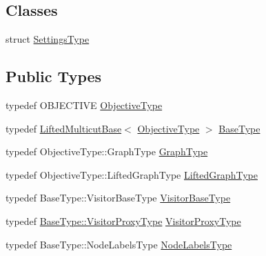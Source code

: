\subsection*{Classes}
\begin{DoxyCompactItemize}
\item 
struct \hyperlink{structnifty_1_1graph_1_1opt_1_1lifted__multicut_1_1LiftedMulticutKernighanLin_1_1SettingsType}{Settings\+Type}
\end{DoxyCompactItemize}
\subsection*{Public Types}
\begin{DoxyCompactItemize}
\item 
typedef O\+B\+J\+E\+C\+T\+I\+VE \hyperlink{classnifty_1_1graph_1_1opt_1_1lifted__multicut_1_1LiftedMulticutKernighanLin_ace1226557a9d65b35b09e1e38b11b0b3}{Objective\+Type}
\item 
typedef \hyperlink{classnifty_1_1graph_1_1opt_1_1lifted__multicut_1_1LiftedMulticutBase}{Lifted\+Multicut\+Base}$<$ \hyperlink{classnifty_1_1graph_1_1opt_1_1lifted__multicut_1_1LiftedMulticutKernighanLin_ace1226557a9d65b35b09e1e38b11b0b3}{Objective\+Type} $>$ \hyperlink{classnifty_1_1graph_1_1opt_1_1lifted__multicut_1_1LiftedMulticutKernighanLin_a6f0d8b3e69c0ee70c3241eda595ae4d2}{Base\+Type}
\item 
typedef Objective\+Type\+::\+Graph\+Type \hyperlink{classnifty_1_1graph_1_1opt_1_1lifted__multicut_1_1LiftedMulticutKernighanLin_a869bf835246678727ca04aacef156c20}{Graph\+Type}
\item 
typedef Objective\+Type\+::\+Lifted\+Graph\+Type \hyperlink{classnifty_1_1graph_1_1opt_1_1lifted__multicut_1_1LiftedMulticutKernighanLin_a577eccc5799d9bdf69ea59ccfcf988af}{Lifted\+Graph\+Type}
\item 
typedef Base\+Type\+::\+Visitor\+Base\+Type \hyperlink{classnifty_1_1graph_1_1opt_1_1lifted__multicut_1_1LiftedMulticutKernighanLin_a3c55dddb71a3b4dabe10de599ff330eb}{Visitor\+Base\+Type}
\item 
typedef \hyperlink{classnifty_1_1graph_1_1opt_1_1common_1_1SolverBase_ad209b469b3bc9fc0fc14e9fed4d09075}{Base\+Type\+::\+Visitor\+Proxy\+Type} \hyperlink{classnifty_1_1graph_1_1opt_1_1lifted__multicut_1_1LiftedMulticutKernighanLin_af5127f5298cb0ea09b88a07094424ed4}{Visitor\+Proxy\+Type}
\item 
typedef Base\+Type\+::\+Node\+Labels\+Type \hyperlink{classnifty_1_1graph_1_1opt_1_1lifted__multicut_1_1LiftedMulticutKernighanLin_aac39b263efe0f990f6bf6989babec8a4}{Node\+Labels\+Type}
\end{DoxyCompactItemize}
